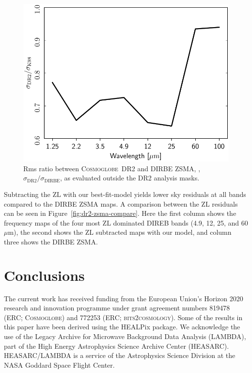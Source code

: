 \documentclass[twocolumn]{aa}
\def\cosmoglobe{\textsc{Cosmoglobe}}
\begin{document}
\begin{figure}
    \centering
    \includegraphics[width=\linewidth]{figs/zodi_rms_ratio_DIRBE_DR2_v2.pdf}
    \caption{Rms ratio between \cosmoglobe\ DR2 and DIRBE ZSMA, ,
      $\sigma_{\mathrm{DR2}}/\sigma_\mathrm{DIRBE}$,
      as evaluated outside the DR2 analysis masks.}
    \label{fig:zsma_rms}
\end{figure}



Subtracting the ZL with our best-fit-model yields lower sky residuals at all bands 
compared to the DIRBE ZSMA maps. A comparison between the ZL residuals can be seen 
in Figure~\ref{fig:dr2-zsma-compare}. Here the first column shows the frequency maps of the
four most ZL dominated DIREB bands (4.9, 12, 25, and 60 $\mu$m), the second shows the ZL
subtracted maps with our model, and column three shows the DIRBE ZSMA.


\section{Conclusions}


\begin{acknowledgements}
 The current work has received funding from the European
  Union’s Horizon 2020 research and innovation programme under grant
  agreement numbers 819478 (ERC; \textsc{Cosmoglobe}) and 772253 (ERC;
  \textsc{bits2cosmology}). Some of the results in this paper have been 
  derived using the HEALPix \citep{Gorski2005} package.
  We acknowledge the use of the Legacy Archive for Microwave Background 
  Data
  Analysis (LAMBDA), part of the High Energy Astrophysics Science
  Archive Center
  (HEASARC). HEASARC/LAMBDA is a service of the Astrophysics Science 
  Division at the NASA Goddard Space Flight Center.  
\end{acknowledgements}
\end{document}
